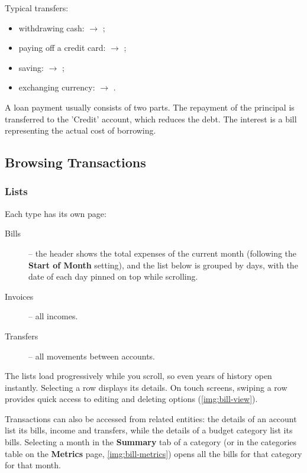 \newpage
\noindent Typical transfers:

\begin{itemize}
  \item withdrawing cash:  $\rightarrow$ ;
  \item paying off a credit card:  $\rightarrow$ ;
  \item saving:  $\rightarrow$ ;
  \item exchanging currency:  $\rightarrow$ .
\end{itemize}

\noindent A loan payment usually consists of two parts. The repayment of the principal is
transferred to the 'Credit' account, which reduces the debt. The interest is a bill
representing the actual cost of borrowing.


\subsection{Browsing Transactions}

\subsubsection{Lists}

Each type has its own page:

\begin{description}
  \item[Bills] -- the header shows the total expenses of the current month (following the
  \textbf{Start of Month} setting), and the list below is grouped by days, with the date of
  each day pinned on top while scrolling.
  \item[Invoices] -- all incomes.
  \item[Transfers] -- all movements between accounts.
\end{description}

\noindent The lists load progressively while you scroll, so even years of history open
instantly. Selecting a row displays its details. On touch screens, swiping a row provides
quick access to editing and deleting options (\cref{img:bill-view}).


Transactions can also be accessed from related entities: the details of an account list its
bills, income and transfers, while the details of a budget category list its bills. Selecting
a month in the \textbf{Summary} tab of a category (or in the categories table on the
\textbf{Metrics} page, \cref{img:bill-metrics}) opens all the bills for that category for
that month.

